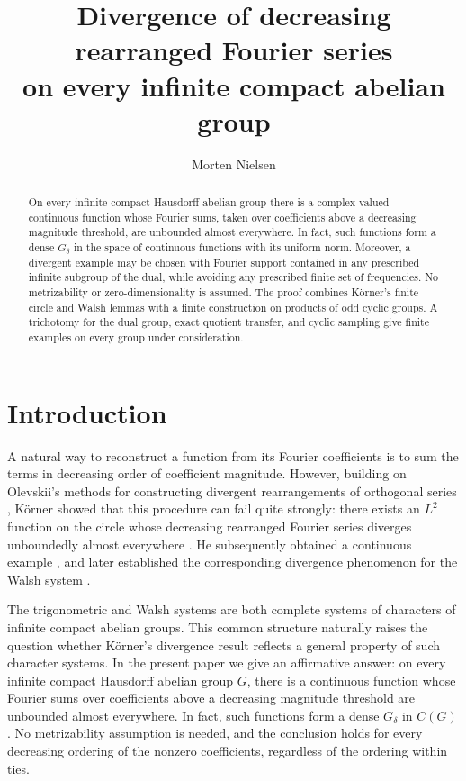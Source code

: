 \documentclass[11pt]{amsart}
\title[Divergence of decreasing rearranged Fourier series]{Divergence of decreasing rearranged Fourier series\\
on every infinite compact abelian group}
\author{Morten Nielsen}
\theoremstyle{definition}
\theoremstyle{remark}
\begin{document}
\begin{abstract}
On every infinite compact Hausdorff abelian group there is a
complex-valued continuous function whose Fourier sums, taken over
coefficients above a decreasing magnitude threshold, are unbounded
almost everywhere. In fact, such functions form a dense \(G_\delta\)
in the space of continuous functions with its uniform norm.
Moreover, a divergent example may be chosen with Fourier support
contained in any prescribed infinite subgroup of the dual, while
avoiding any prescribed finite set of frequencies.
No metrizability or zero-dimensionality is assumed.
The proof combines K\"orner's finite circle and Walsh lemmas with a
finite construction on products of odd cyclic groups. A trichotomy
for the dual group, exact quotient transfer, and cyclic sampling
give finite examples on every group under consideration.
\end{abstract}

\maketitle



\section*{Introduction}
A natural way to reconstruct a function from its Fourier coefficients
is to sum the terms in decreasing order of coefficient magnitude.
However, building on Olevskii's methods for constructing divergent rearrangements
of orthogonal series \cite[pp.~59--68]{O75}, K\"orner showed that this
procedure can fail quite strongly: there exists an \(L^2\) function on
the circle whose decreasing rearranged Fourier series diverges unboundedly
almost everywhere \cite{K96}.
He subsequently obtained a continuous example \cite{K99}, and later
established the corresponding divergence phenomenon for the Walsh
system \cite{K06}.

The trigonometric and Walsh systems are both complete systems of
characters of infinite compact abelian groups. This common structure
naturally raises the question whether K\"orner's divergence result
reflects a general property of such character systems. In the present
paper we give an affirmative answer: on every infinite compact
Hausdorff abelian group \(G\), there is a continuous function whose
Fourier sums over coefficients above a decreasing magnitude threshold
are unbounded almost everywhere. In fact, such functions form a dense
\(G_\delta\) in \(C(G)\). No metrizability assumption is needed, and
the conclusion holds for every decreasing ordering of the nonzero
coefficients, regardless of the ordering within ties.
\end{document}
